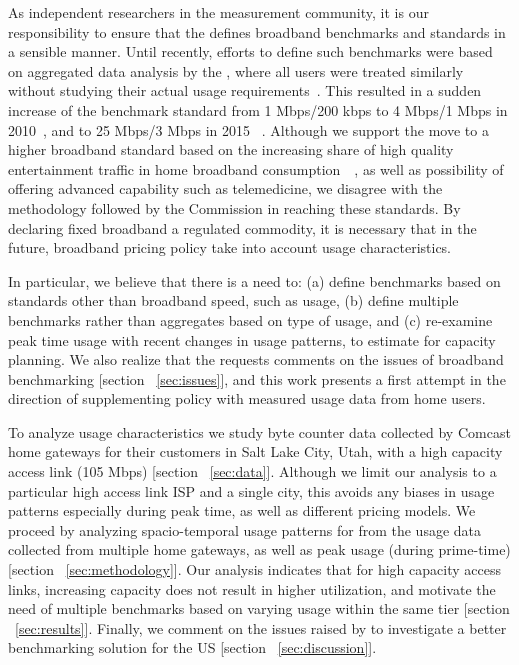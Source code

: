 As independent researchers in the measurement community, it is our responsibility to ensure that the \FCC defines broadband benchmarks and standards in a sensible manner. Until recently, efforts to define such benchmarks were based on aggregated data analysis by the \FCC, where all users were treated similarly without studying their actual usage requirements~\cite{report2010-2014}. This resulted in a sudden increase of the benchmark standard from 1 Mbps/200 kbps to 4 Mbps/1 Mbps in 2010~\cite{}, and to 25 Mbps/3 Mbps in 2015~\cite{} . Although we support the move to a higher broadband standard based on the increasing share of high quality entertainment traffic in home broadband consumption~\cite{sandvine2014report1}~\cite{sandvine2014report2}, as well as possibility of offering advanced capability such as telemedicine, we disagree with the methodology followed by the Commission in reaching these standards. By declaring fixed broadband a regulated commodity, it is necessary that in the future, broadband pricing policy take into account usage characteristics.


In particular, we believe that there is a need to: (a) define benchmarks based on standards other than broadband speed, such as usage, (b) define multiple benchmarks rather than aggregates based on type of usage, and (c) re-examine peak time usage with recent changes in usage patterns, to estimate for capacity planning. We also realize that the \FCC requests comments on the issues of broadband benchmarking [section ~\ref{sec:issues}], and this work presents a first attempt in the direction of supplementing \FCC policy with measured usage data from home users.




To analyze usage characteristics we study byte counter data collected by Comcast home gateways for their customers in Salt Lake City, Utah, with a high capacity access link (105 Mbps) [section ~\ref{sec:data}]. Although we limit our analysis to a particular high access link ISP and a single city, this avoids any biases in usage patterns especially during peak time, as well as different pricing models. We proceed by analyzing spacio-temporal usage patterns for from the usage data collected from multiple home gateways, as well as peak usage (during prime-time) [section ~\ref{sec:methodology}]. Our analysis indicates that for high capacity access links, increasing capacity does not result in higher utilization, and motivate the need of multiple benchmarks based on varying usage within the same tier [section ~\ref{sec:results}]. Finally, we comment on the issues raised by \FCC to investigate a better benchmarking solution for the US [section ~\ref{sec:discussion}].

